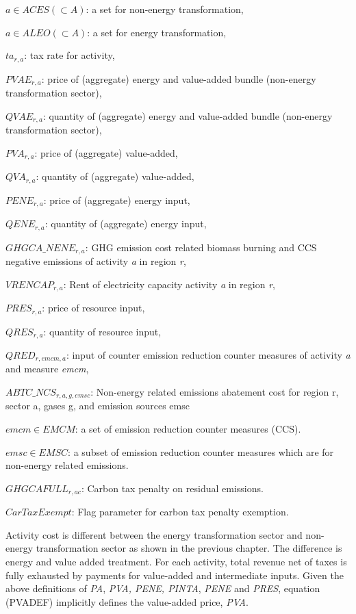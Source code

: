 \documentclass[10pt,a4paper,titlepage,dvipdfmx]{book}
\begin{document}
\begin{flushleft}
$a\in ACES\left(\subset A\right)$: a set for non-energy transformation,

$a\in ALEO\left(\subset A\right)$: a set for energy transformation,

$ta_{r,a}$: tax rate for activity,

$PVAE_{r,a}$: price of (aggregate) energy and value-added bundle (non-energy transformation sector),

$QVAE_{r,a}$: quantity of (aggregate) energy and value-added bundle (non-energy transformation sector),

$PVA_{r,a}$: price of (aggregate) value-added,

$QVA_{r,a}$: quantity of (aggregate) value-added,

$PENE_{r,a}$: price of (aggregate) energy input,

$QENE_{r,a}$: quantity of (aggregate) energy input,

$GHGCA\_NENE_{r,a}$: GHG emission cost related biomass burning and CCS negative emissions of activity \textit{a} in region \textit{r},

$VRENCAP_{r,a}$: Rent of electricity capacity activity \textit{a} in region \textit{r},

$PRES_{r,a}$: price of resource input,

$QRES_{r,a}$: quantity of resource input,

$QRED_{r,emcm,a}$: input of counter emission reduction counter measures of activity \textit{a} and measure \textit{emcm},

$ABTC\_NCS_{r,a,g,emsc}$: Non-energy related emissions abatement cost for region r, sector a, gases g, and emission sources emsc

$emcm\in EMCM$: a set of emission reduction counter measures (CCS).

$emsc\in EMSC$: a subset of emission reduction counter measures which are for non-energy related emissions.

$GHGCAFULL_{r,ac}$: Carbon tax penalty on residual emissions. 

$CarTaxExempt$: Flag parameter for carbon tax penalty exemption.

\end{flushleft}

Activity cost is different between the energy transformation sector and non-energy transformation sector as shown in the previous chapter. The difference is energy and value added treatment. For each activity, total revenue net of taxes is fully exhausted by payments for value-added and intermediate inputs. Given the above definitions of \textit{PA}, \textit{PVA, PENE, PINTA}, \textit{PENE} and \textit{PRES}, equation (PVADEF) implicitly defines the value-added price, \textit{PVA}.
\end{document}
